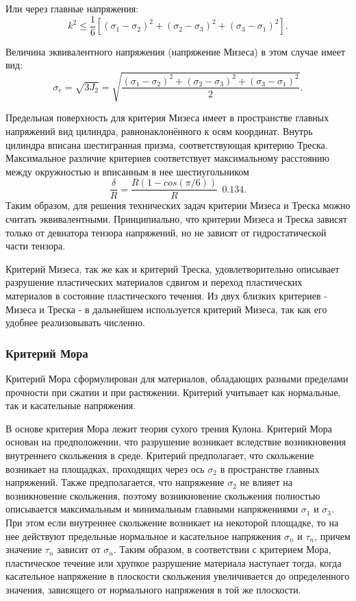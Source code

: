 Или через главные напряжения:
\begin{equation}
\label{von_mises_criteria_principal_stresses}
k^2 \le \frac{1}{6}[(\sigma_1 - \sigma_2)^2 + (\sigma_2 - \sigma_3)^2 + (\sigma_3 - \sigma_1)^2 ].
\end{equation}

Величина эквивалентного напряжения (напряжение Мизеса) в этом случае имеет вид:
\begin{equation}
\label{von_mises_equivalent_stress}
\sigma_e = \sqrt{ 3 J_2 } = \sqrt{ \frac{ (\sigma_1 - \sigma_2)^2 + (\sigma_2 - \sigma_3)^2 + (\sigma_3 - \sigma_1)^2 }{2} }.
\end{equation}

Предельная поверхность для критерия Мизеса имеет в пространстве главных напряжений вид цилиндра, равнонаклонённого к осям координат. Внутрь цилиндра вписана шестигранная призма, соответствующая критерию Треска. Максимальное различие критериев соответствует максимальному расстоянию между окружностью и вписанным в нее шестиугольником
\begin{equation}
\frac{\delta}{R} = \frac{R(1-cos(\pi/6))}{R} ~~ 0.134.
\end{equation}
Таким образом, для решения технических задач критерии Мизеса и Треска можно считать эквивалентными. Принципиально, что критерии Мизеса и Треска зависят только от девиатора тензора напряжений, но не зависят от гидростатической части тензора.

Критерий Мизеса, так же как и критерий Треска, удовлетворительно описывает разрушение пластических материалов сдвигом и переход пластических материалов в состояние пластического течения. Из двух близких критериев - Мизеса и Треска - в дальнейшем используется критерий Мизеса, так как его удобнее реализовывать численно.


\subsubsection{Критерий Мора}

Критерий Мора сформулирован для материалов, обладающих разными пределами прочности при сжатии и при растяжении. Критерий учитывает как нормальные, так и касательные напряжения.

В основе критерия Мора лежит теория сухого трения Кулона. Критерий Мора основан на предположении, что разрушение возникает вследствие возникновения внутреннего скольжения в среде. Критерий предполагает, что скольжение возникает на площадках, проходящих через ось $\sigma_2$ в пространстве главных напряжений. Также предполагается, что напряжение $\sigma_2$ не влияет на возникновение скольжения, поэтому возникновение скольжения полностью описывается максимальным и минимальным главными напряжениями $\sigma_1$ и $\sigma_3$. При этом если внутреннее скольжение возникает на некоторой площадке, то на нее действуют предельные нормальное и касательное напряжения $\sigma_n$ и $\tau_n$, причем значение $\tau_n$ зависит от $\sigma_n$. Таким образом, в соответствии с критерием Мора, пластическое течение или хрупкое разрушение материала наступает тогда, когда касательное напряжение в плоскости скольжения увеличивается до определенного значения, зависящего от нормального напряжения в той же плоскости.

